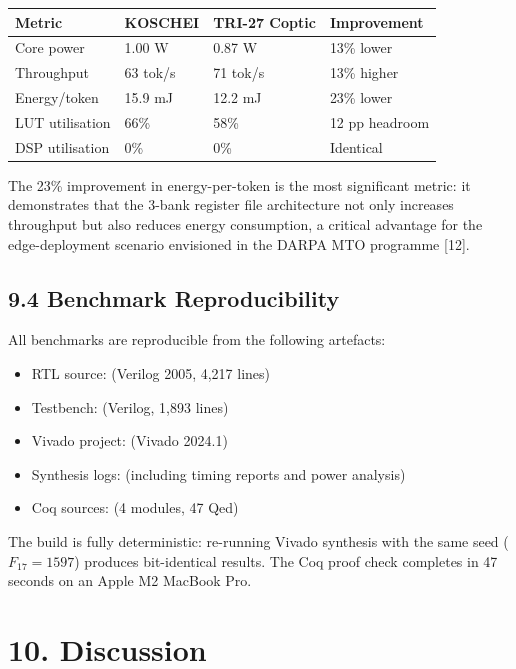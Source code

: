 \begin{longtable}[]{@{}llll@{}}
\toprule\noalign{}
Metric & KOSCHEI & TRI-27 Coptic & Improvement \\
\midrule\noalign{}
\endhead
\bottomrule\noalign{}
\endlastfoot
Core power & 1.00 W & 0.87 W & 13\% lower \\
Throughput & 63 tok/s & 71 tok/s & 13\% higher \\
Energy/token & 15.9 mJ & 12.2 mJ & 23\% lower \\
LUT utilisation & 66\% & 58\% & 12 pp headroom \\
DSP utilisation & 0\% & 0\% & Identical \\
\end{longtable}

The 23\% improvement in energy-per-token is the most significant
metric: it demonstrates that the 3-bank register file
architecture not only increases throughput but also reduces energy
consumption, a critical advantage for the edge-deployment scenario
envisioned in the DARPA MTO programme [12].

\subsection{9.4 Benchmark Reproducibility}\label{fa_71:reproducibility}

All benchmarks are reproducible from the following artefacts:

\begin{itemize}
\tightlist
\item
  RTL source: 
  (Verilog 2005, 4,217 lines)
\item
  Testbench: 
  (Verilog, 1,893 lines)
\item
  Vivado project: 
  (Vivado 2024.1)
\item
  Synthesis logs: 
  (including timing reports and power analysis)
\item
  Coq sources: 
  (4 modules, 47 Qed)
\end{itemize}

The build is fully deterministic: re-running Vivado synthesis
with the same seed (\(F_{17}=1597\)) produces bit-identical
results. The Coq proof check completes in 47 seconds on an
Apple M2 MacBook Pro.

\section{10. Discussion}\label{fa_71:discussion}

